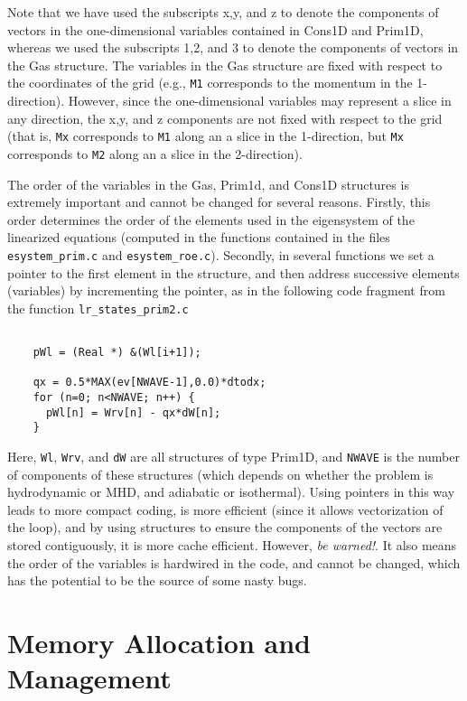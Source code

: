 Note that we have used the subscripts x,y, and z to denote the components
of vectors in the one-dimensional variables contained in Cons1D and
Prim1D, whereas we used the subscripts 1,2, and 3 to denote the components
of vectors in the Gas structure.  The variables in the Gas structure
are fixed with respect to the coordinates of the grid (e.g., {\tt M1}
corresponds to the momentum in the 1-direction).  However, since the
one-dimensional variables may represent a slice in any direction, the
x,y, and z components are not fixed with respect to the grid (that is,
{\tt Mx} corresponds to {\tt M1} along an a slice in the 1-direction,
but {\tt Mx} corresponds to {\tt M2} along an a slice in the 2-direction).

The order of the variables in the Gas, Prim1d, and Cons1D structures is
extremely important and
cannot be changed for several reasons.  Firstly, this order determines the
order of the elements used in the eigensystem of the linearized equations
(computed in the functions contained in the files {\tt esystem\_prim.c}
and {\tt esystem\_roe.c}).  Secondly, in several functions we set a
pointer to the first element in the structure, and then address successive
elements (variables) by incrementing the pointer, as in the
following code fragment from the function {\tt lr\_states\_prim2.c}

\footnotesize
\begin{verbatim}

    pWl = (Real *) &(Wl[i+1]);

    qx = 0.5*MAX(ev[NWAVE-1],0.0)*dtodx;
    for (n=0; n<NWAVE; n++) {
      pWl[n] = Wrv[n] - qx*dW[n];
    }

\end{verbatim}
\normalsize
Here, {\tt Wl}, {\tt Wrv}, and {\tt dW} are all structures of type Prim1D,
and {\tt NWAVE} is the number of components of these structures (which
depends on whether the problem is hydrodynamic or MHD, and adiabatic or
isothermal).  Using pointers in this way leads to more compact coding,
is more efficient (since it allows vectorization of the loop), and by
using structures to ensure the components of the vectors are stored
contiguously, it is more cache efficient.  However, {\em be warned!}.
It also means the order of the variables is hardwired in the code,
and cannot be changed, which has the potential to be the source of some
nasty bugs.

\section{Memory Allocation and Management}

